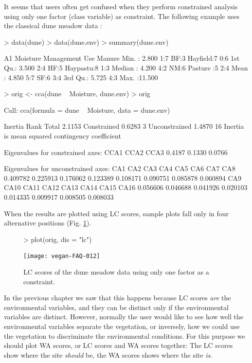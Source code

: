\documentclass[a4paper]{article}
\begin{document}
It seems that users often get confused when they perform constrained
analysis using  only one factor (class variable) as constraint.  The
following example uses the classical dune meadow data \cite{Jongman87}:
\begin{Schunk}
\begin{Sinput}
> data(dune)
> data(dune.env)
> summary(dune.env)
\end{Sinput}
\begin{Soutput}
       A1         Moisture Management       Use    Manure
 Min.   : 2.800   1:7      BF:3       Hayfield:7   0:6   
 1st Qu.: 3.500   2:4      HF:5       Haypastu:8   1:3   
 Median : 4.200   4:2      NM:6       Pasture :5   2:4   
 Mean   : 4.850   5:7      SF:6                    3:4   
 3rd Qu.: 5.725                                    4:3   
 Max.   :11.500                                          
\end{Soutput}
\begin{Sinput}
> orig <- cca(dune ~ Moisture, dune.env)
> orig
\end{Sinput}
\begin{Soutput}
Call:
cca(formula = dune ~ Moisture, data = dune.env) 

              Inertia Rank
Total          2.1153     
Constrained    0.6283    3
Unconstrained  1.4870   16
Inertia is mean squared contingency coefficient 

Eigenvalues for constrained axes:
  CCA1   CCA2   CCA3 
0.4187 0.1330 0.0766 

Eigenvalues for unconstrained axes:
     CA1      CA2      CA3      CA4      CA5      CA6      CA7      CA8 
0.409782 0.225913 0.176062 0.123389 0.108171 0.090751 0.085878 0.060894 
     CA9     CA10     CA11     CA12     CA13     CA14     CA15     CA16 
0.056606 0.046688 0.041926 0.020103 0.014335 0.009917 0.008505 0.008033 
\end{Soutput}
\end{Schunk}
When the results are plotted using LC scores, sample plots fall only
in four alternative positions (Fig. \ref{fig:factorlc}).
\begin{figure}
\begin{center}
\begin{Schunk}
\begin{Sinput}
> plot(orig, dis = "lc")
\end{Sinput}
\end{Schunk}
\texttt{[image: vegan-FAQ-012]}
\caption{LC scores of the dune meadow data using only one factor as a
  constraint.} 
\label{fig:factorlc}
\end{center}
\end{figure}
In the previous chapter we saw that this happens because LC scores
\emph{are} the environmental variables, and they can be distinct only
if the environmental variables are distinct.  However, normally the user
would like to see how well the environmental variables separate the
vegetation, or inversely, how we could use the vegetation to
discriminate the environmental conditions.  For this purpose we should
plot WA scores, or LC scores and WA scores together:  The LC scores
show where the site \emph{should} be, the WA scores shows where the
site \emph{is}.
\end{document}

